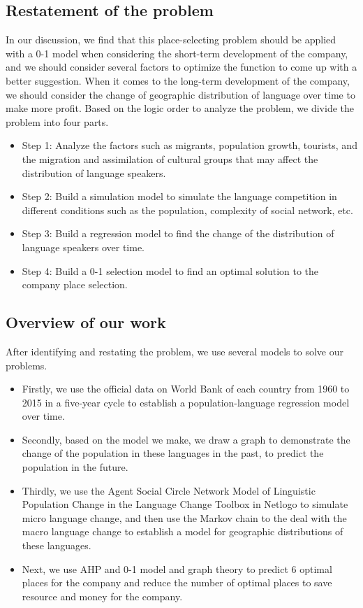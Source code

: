 \documentclass{mcmthesis}
\begin{document}
\subsection{Restatement of the problem}
\hspace*{8mm}In our discussion, we find that this place-selecting problem should be applied with a 0-1 model when considering the short-term development of the company, and we should consider several factors to optimize the function to come up with a better suggestion. When it comes to the long-term development of the company, we should consider the change of geographic distribution of language over time to make more profit. Based on the logic order to analyze the problem, we divide the problem into four parts.\\
\begin{itemize}
\item Step 1: Analyze the factors such as migrants, population growth, tourists, and the migration and assimilation of cultural groups that may affect the distribution of language speakers.\\
\item Step 2: Build a simulation model to simulate the language competition in different conditions such as the population, complexity of social network, etc.\\
\item Step 3: Build a regression model to find the change of the distribution of language speakers over time.\\
\item Step 4: Build a 0-1 selection model to find an optimal solution to the company place selection.\\
\end{itemize}

\subsection{Overview of our work}
\hspace*{8mm}After identifying and restating the problem, we use several models to solve our problems.
\begin{itemize}
\item Firstly, we use the official data on World Bank of each country from 1960 to 2015 in a five-year cycle to establish a population-language regression model over time.
\item Secondly, based on the model we make, we draw a graph to demonstrate the change of the population in these languages in the past, to predict the population in the future.
\item Thirdly, we use the Agent Social Circle Network Model of Linguistic Population Change in the Language Change Toolbox in Netlogo to simulate micro language change, and then use the Markov chain to the deal with the macro language change to establish a model for geographic distributions of these languages.
\item Next, we use AHP and 0-1 model and graph theory to predict 6 optimal places for the company and reduce the number of optimal places to save resource and money for the company.
\end{itemize}
\end{document}
